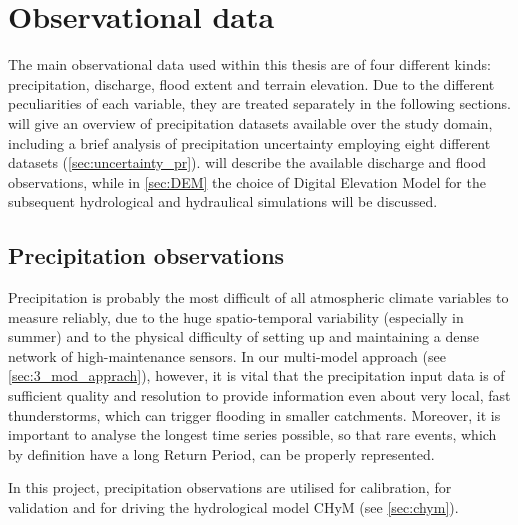 \chapter{Observational data}\label{chp:obs}
The main observational data used within this thesis are of four different kinds: precipitation, discharge, flood extent and terrain elevation. Due to the different peculiarities of each variable, they are treated separately in the following sections.  will give an overview of precipitation datasets available over the study domain, including a brief analysis of precipitation uncertainty employing eight different datasets (\cref{sec:uncertainty_pr}).  will describe the available discharge and flood observations, while in \cref{sec:DEM} the choice of Digital Elevation Model for the subsequent hydrological and hydraulical simulations will be discussed.

\section{Precipitation observations} \label{sec:pr_obs}
Precipitation is probably the most difficult of all atmospheric climate variables to measure reliably, due to the huge spatio-temporal variability (especially in summer) and to the physical difficulty of setting up and maintaining a dense network of high-maintenance sensors. In our multi-model approach (see \cref{sec:3_mod_apprach}), however, it is vital that the precipitation input data is of sufficient quality and resolution to provide information even about very local, fast thunderstorms, which can trigger flooding in smaller catchments. Moreover, it is important to analyse the longest time series possible, so that rare events, which by definition have a long Return Period, can be properly represented.

In this project, precipitation observations are utilised for calibration, for validation and for driving the hydrological model CHyM (see \cref{sec:chym}).
  
